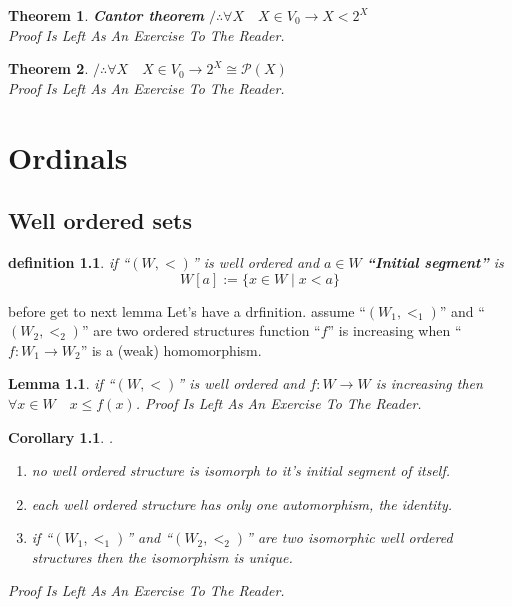 \documentclass[10pt,a4paper]{book}
\newtheorem{definition}{definition}[section]
\newtheorem{theorem}{Theorem}[section]
\newtheorem{lemma}{Lemma}[section]
\newtheorem{corollary}{Corollary}[section]
\begin{document}
\begin{theorem} \textbf{Cantor theorem} $/ \therefore \forall X \quad X \in V_0 \to X <  2^X $ \\
    Proof Is Left As An Exercise To The Reader.
\end{theorem}

\begin{theorem} $/ \therefore \forall X \quad X \in V_0 \to 2^X \cong \mathcal{P}(X)$ \\
    Proof Is Left As An Exercise To The Reader.
\end{theorem}

\chapter{Ordinals }

\section{Well ordered sets}

\begin{definition}
    if  ``$(W , <)$'' is well ordered and $a \in W$  \textbf{``Initial segment''} is
    \[ W[a] :=  \{ x \in W \mid x < a \} \]
\end{definition}

before get to next lemma Let's have a drfinition. assume ``$(W_1 , <_1)$'' and
``$(W_2 , <_2)$'' are two ordered structures function ``$f$'' is increasing
when ``$f : W_1 \to W_2$'' is a (weak) homomorphism.

\begin{lemma}
    if  ``$(W , <)$'' is well ordered and $f : W \to W$  is increasing then
    $ \forall x \in  W \quad x \leq f(x) $.
    Proof Is Left As An Exercise To The Reader.
\end{lemma}

\begin{corollary}  .\\
    \begin{enumerate}
        \setlength{\itemsep}{0pt} %
        \item      no well ordered structure is isomorph to it's initial segment of itself.
        \item      each well ordered structure has only one automorphism, the identity.
        \item      if ``$(W_1 , <_1)$'' and ``$(W_2 , <_2)$'' are two isomorphic well ordered
              structures then the isomorphism is unique.
    \end{enumerate}
    Proof Is Left As An Exercise To The Reader.
\end{corollary}
\end{document}
